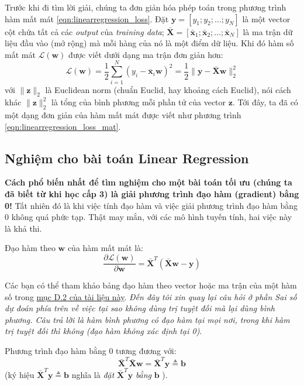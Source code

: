 Trước khi đi tìm lời giải, chúng ta đơn giản hóa phép toán trong phương trình hàm mất mát \eqref{eqn:linearregression_loss}. Đặt $\mathbf{y} = [y_1; y_2; \dots; y_N]$ là một vector cột chứa tất cả các \textit{output} của \textit{training data}; $ \mathbf{\bar{X}} = [\mathbf{\bar{x}}_1; \mathbf{\bar{x}}_2; \dots; \mathbf{\bar{x}}_N ] $ là ma trận dữ liệu đầu vào (mở rộng) mà mỗi hàng của nó là một điểm dữ liệu. Khi đó hàm số mất mát $\mathcal{L}(\mathbf{w})$ được viết dưới dạng ma trận đơn giản hơn: 
\begin{equation}
\label{eqn:linearregression_loss_mat}
\mathcal{L}(\mathbf{w})  
= \frac{1}{2}\sum_{i=1}^N (y_i - \mathbf{\bar{x}}_i\mathbf{w})^2 
= \frac{1}{2} \|\mathbf{y} - \mathbf{\bar{X}}\mathbf{w} \|_2^2  
\end{equation} 
với $ \| \mathbf{z} \|_2 $ là Euclidean norm (chuẩn Euclid, hay khoảng cách Euclid), nói cách khác $ \| \mathbf{z} \|_2^2 $ là tổng của bình phương mỗi phần tử của vector $\mathbf{z}$. Tới đây, ta đã có một dạng đơn giản của hàm mất mát được viết như phương trình \eqref{eqn:linearregression_loss_mat}. 
 
 
 
 
\subsection{Nghiệm cho bài toán Linear Regression}
 
\textbf{Cách phổ biến nhất để tìm nghiệm cho một bài toán tối ưu (chúng ta đã biết từ khi học cấp 3) là giải phương trình đạo hàm (gradient) bằng 0!} Tất nhiên đó là khi việc tính đạo hàm và việc giải phương trình đạo hàm bằng 0 không quá phức tạp. Thật may mắn, với các mô hình tuyến tính, hai việc này là khả thi.  
 
Đạo hàm theo $\mathbf{w} $ của hàm mất mát là:  
$$ 
\frac{\partial{\mathcal{L}(\mathbf{w})}}{\partial{\mathbf{w}}}  
= \mathbf{\bar{X}}^T(\mathbf{\bar{X}}\mathbf{w} - \mathbf{y})  
$$ 
 
Các bạn có thể tham khảo bảng đạo hàm theo vector hoặc ma trận của một hàm số trong \href{https://ccrma.stanford.edu/~dattorro/matrixcalc.pdf}{mục D.2 của tài liệu này}. \textit{Đến đây tôi xin quay lại câu hỏi ở phần Sai số dự đoán phía trên về việc tại sao không dùng trị tuyệt đối mà lại dùng bình phương. Câu trả lời là hàm bình phương có đạo hàm tại mọi nơi, trong khi hàm trị tuyệt đối thì không (đạo hàm không xác định tại 0)}. 
 
Phương trình đạo hàm bằng 0 tương đương với:  
\begin{equation}
\label{eqn:linearregression_gradient}
\mathbf{\bar{X}}^T\mathbf{\bar{X}}\mathbf{w} = \mathbf{\bar{X}}^T\mathbf{y} \triangleq \mathbf{b}  
\end{equation}
(ký hiệu $\mathbf{\bar{X}}^T\mathbf{y} \triangleq \mathbf{b} $ nghĩa là \textit{đặt} $\mathbf{\bar{X}}^T\mathbf{y}$ \textit{bằng} $\mathbf{b}$ ). 
 

